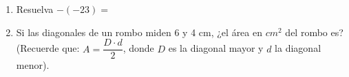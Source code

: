\documentclass[11pt,twoside]{article}
\begin{document}
\begin{enumerate}
  \item Resuelva $-(-23)=$
  \item Si las diagonales de un rombo miden 6 y 4 cm, ¿el área en $cm^{2}$ del rombo es? (Recuerde que: $ A=\dfrac{D\cdot d}{2} $, donde $ D $ es la diagonal mayor y $ d $ la diagonal menor).
 \end{enumerate}
\end{document}
